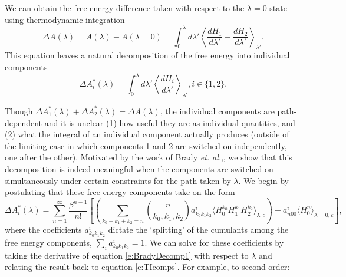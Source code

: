 \documentclass[%
 preprint,
 amsmath,amssymb,
 aps,
]{revtex4-1}
\begin{document}
We can obtain the free energy difference taken with respect to the $\lambda=0$ state using thermodynamic integration\cite{NULL}
\begin{equation}
\Delta A (\lambda)= A(\lambda)-A(\lambda=0)  = \int_0^{\lambda} d \lambda'
\left\langle \frac{dH_1}{d \lambda'} +  \frac{dH_2}{d \lambda'}  \right \rangle_{\lambda'}.
\label{e:TI}
\end{equation}
This equation leaves a natural decomposition of the free energy into individual components
\begin{equation}
\Delta A^*_i  (\lambda) = \int_0^{\lambda} d \lambda' 
\left\langle \frac{dH_i}{d \lambda'} \right \rangle_{\lambda'}, i \in \{ 1,2 \}.
\label{e:TIcomps}
\end{equation}
 
 Though $\Delta A^*_1  (\lambda)+ \Delta A^*_2  (\lambda)= \Delta A (\lambda)$, the individual components are path-dependent and it is unclear (1) how useful they are as individual quantities, and (2) what the integral of an individual component actually produces (outside of the limiting case in which components 1 and 2 are switched on independently, one after the other).  Motivated by the work of Brady \emph{et. al.},\cite{NULL}, we show that 
 this decomposition is indeed meaningful when the components are switched on simultaneously under certain constraints for the path taken by $\lambda$.  We begin by postulating that these free energy components take on the form
 \begin{equation}
\Delta A^*_i  (\lambda)=
\sum_{n=1}^{\infty}  \frac{\beta^{n-1}}{n!} 
\left[
\left(
 \sum_{k_0+k_1+k_2=n} 
{ n \choose k_0,k_1,k_2 } a^i_{k_0k_1k_2} \langle  H_0^{k_0} H_1^{k_1} H_2^{k_2} \rangle_{\lambda,c}
\right)
- a^i_{n00} \langle  H_0^{n}  \rangle_{\lambda=0,c}
\right],
\label{e:BradyDecomp1}
\end{equation}
where the coefficients $ a^i_{k_0k_1k_2}  $ dictate the `splitting' of the cumulants among the free energy components, 
$\sum_i a^i_{k_0k_1k_2} = 1$. 
We can solve for these coefficients by taking the derivative of equation \ref{e:BradyDecomp1} with respect to $\lambda$ and relating the result back to equation \ref{e:TIcomps}.  For example, to second order: 
\end{document}
